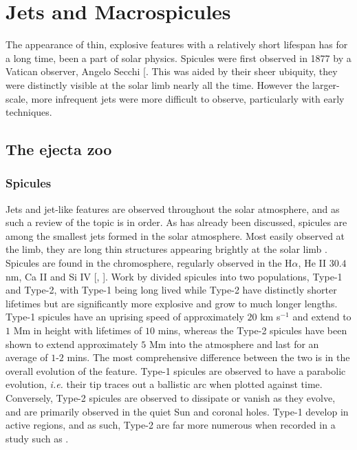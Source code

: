 



\chapter{Jets and Macrospicules}
\label{ch:2}



The appearance of thin, explosive features with a relatively short lifespan has for a long time, been a part of solar physics.
Spicules were first observed in 1877 by a Vatican observer, Angelo Secchi [\cite{Lang2009}.
This was aided by their sheer ubiquity, they were distinctly visible at the solar limb nearly all the time.
However the larger-scale, more infrequent jets were more difficult to observe, particularly with early techniques.

\section{The ejecta zoo}


\subsection{Spicules}
Jets and jet-like features are observed throughout the solar atmosphere, and as such a review of the topic is in order.
As has already been discussed, spicules are among the smallest jets formed in the solar atmosphere. 
Most easily observed at the limb, they are long thin structures appearing brightly at the solar limb \cite{Beckers1972}.
Spicules are found in the chromosphere, regularly observed in the H$\alpha$, He II $30.4$ nm, Ca II and Si IV [\cite{Sterling2000}, \cite{Tsiropoula2012}].
Work by \cite{DePontieu2007} divided spicules into two populations, Type-1 and Type-2, with Type-1 being long lived while Type-2 have distinctly shorter lifetimes but are significantly more explosive and grow to much longer lengths.
Type-1 spicules have an uprising speed of approximately $20$ km s$^{-1}$ and extend to $1$ Mm in height with lifetimes of $10$ mins, whereas the Type-2 spicules have been shown to extend approximately $5$ Mm into the atmosphere and last for an average of $1$-$2$ mins. 
The most comprehensive difference between the two is in the overall evolution of the feature.
Type-1 spicules are observed to have a parabolic evolution, \emph{i.e.} their tip traces out a ballistic arc when plotted against time.
Conversely, Type-2 spicules are observed to dissipate or vanish as they evolve, and are primarily observed in the quiet Sun and coronal holes.
Type-1 develop in active regions, and as such, Type-2 are far more numerous when recorded in a study such as \cite{Pereira2012}.

